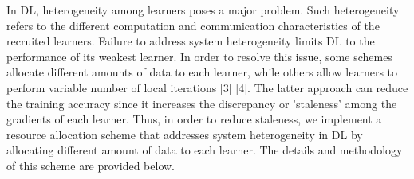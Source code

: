 \documentclass[../mthe-493-project-proposal.tex]{subfiles}
\begin{document}
    In DL, heterogeneity among learners poses a major problem. Such heterogeneity refers to the different computation and communication characteristics of the recruited learners. Failure to address system heterogeneity limits DL to the performance of its weakest learner. In order to resolve this issue, some schemes allocate different amounts of data to each learner, while others allow learners to perform variable number of local iterations [3] [4]. The latter approach can reduce the training accuracy since it increases the discrepancy or ’staleness’ among the gradients of each learner. Thus, in order to reduce staleness, we implement a resource allocation scheme that addresses system heterogeneity in DL by allocating different amount of data to each learner. The details and methodology of this scheme are provided below.
\end{document}
